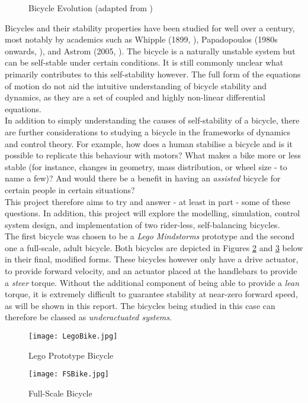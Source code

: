 \begin{figure}[H]
	\centering
    \def\svgwidth{0.9\textwidth}
    
    \caption{Bicycle Evolution (adapted from \cite{bikeevo})}
	\label{fig:bikeevo}
\end{figure}

Bicycles and their stability properties have been studied for well over a century, most notably by academics such as Whipple (1899, \cite{whipple}), Papadopoulos (1980s onwards, \cite{papadopoulos}), and Astrom (2005, \cite{astrom}). The bicycle is a naturally unstable system but can be self-stable under certain conditions. It is still commonly unclear what primarily contributes to this self-stability however. The full form of the equations of motion do not aid the intuitive understanding of bicycle stability and dynamics, as they are a set of coupled and highly non-linear differential equations. \\

\noindent In addition to simply understanding the causes of self-stability of a bicycle, there are further considerations to studying a bicycle in the frameworks of dynamics and control theory. For example, how does a human stabilise a bicycle and is it possible to replicate this behaviour with motors? What makes a bike more or less stable (for instance, changes in geometry, mass distribution, or wheel size - to name a few)? And would there be a benefit in having an \textit{assisted} bicycle for certain people in certain situations? \\

\noindent This project therefore aims to try and answer - at least in part - some of these questions. In addition, this project will explore the modelling, simulation, control system design, and implementation of two rider-less, self-balancing bicycles. \\

The first bicycle was chosen to be a \textit{Lego Mindstorms} prototype and the second one a full-scale, adult bicycle. Both bicycles are depicted in Figures \ref{fig:lego} and \ref{fig:fs} below in their final, modified forms. These bicycles however only have a drive actuator, to provide forward velocity, and an actuator placed at the handlebars to provide a \textit{steer} torque. Without the additional component of being able to provide a \textit{lean} torque, it is extremely difficult to guarantee stability at near-zero forward speed, as will be shown in this report. The bicycles being studied in this case can therefore be classed as \textit{underactuated systems}.

\vfill

\begin{figure}[h]
\centering
\texttt{[image: LegoBike.jpg]}
\caption{Lego Prototype Bicycle}
\label{fig:lego}
\end{figure}

\begin{figure}[h]
\centering
\texttt{[image: FSBike.jpg]}
\caption{Full-Scale Bicycle}
\label{fig:fs}
\end{figure}

\newpage
